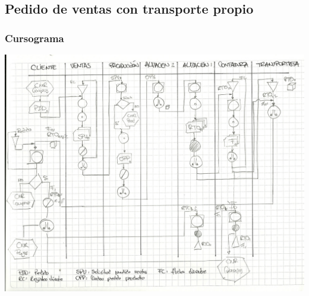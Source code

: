 \subsection{Pedido de ventas con transporte propio}

\subsubsection{Cursograma}
\includegraphics [angle=90]{Empresa/Circuitos/Ventas/ventas.jpg}

\pagebreak

